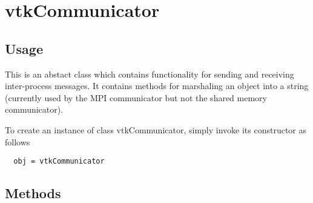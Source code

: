 \section{vtkCommunicator}

\subsection{Usage}

 This is an abstact class which contains functionality for sending
 and receiving inter-process messages. It contains methods for marshaling
 an object into a string (currently used by the MPI communicator but
 not the shared memory communicator).

To create an instance of class vtkCommunicator, simply
invoke its constructor as follows
\begin{verbatim}
  obj = vtkCommunicator
\end{verbatim}
\subsection{Methods}

